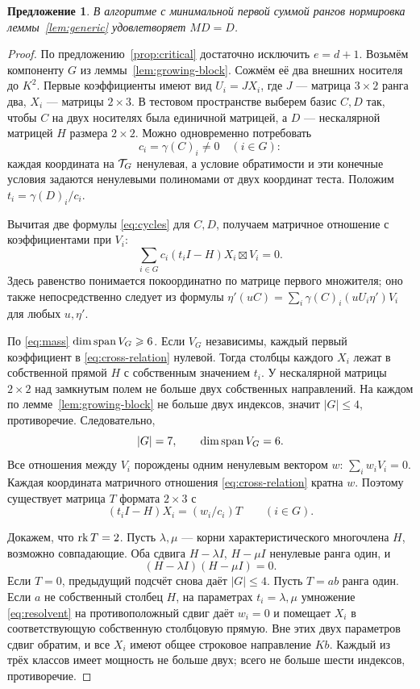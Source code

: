 \documentclass[11pt,a4paper]{article}
\numberwithin{equation}{section}
\theoremstyle{plain}
\newtheorem{prop}[theorem]{Предложение}
\theoremstyle{definition}
\newcommand{\leqs}{\leqslant}\newcommand{\geqs}{\geqslant}
\begin{document}
\begin{prop}\label{prop:no-growth}
В алгоритме с минимальной первой суммой рангов нормировка
леммы~\ref{lem:generic} удовлетворяет $MD=D$.
\end{prop}
\begin{proof}
По предложению~\ref{prop:critical} достаточно исключить $e=d+1$.
Возьмём компоненту $G$ из леммы~\ref{lem:growing-block}.
Сожмём её два внешних носителя до $K^2$. Первые коэффициенты имеют вид
$U_i=JX_i$, где $J$ --- матрица $3\times2$ ранга два,
$X_i$ --- матрицы $2\times3$. В тестовом пространстве выберем базис
$C,D$ так, чтобы $C$ на двух носителях была единичной матрицей,
а $D$ --- нескалярной матрицей $H$ размера $2\times2$.
Можно одновременно потребовать
\[
 c_i=\gamma(C)_i\ne0\quad(i\in G):
\]
каждая координата на $\mathcal T_G$ ненулевая, а условие обратимости
и эти конечные условия задаются ненулевыми полиномами от двух
координат теста. Положим $t_i=\gamma(D)_i/c_i$.

Вычитая две формулы \eqref{eq:cycles} для $C,D$, получаем матричное
отношение с коэффициентами при $V_i$:
\begin{equation}\label{eq:cross-relation}
 \sum_{i\in G} c_i(t_iI-H)X_i\boxtimes V_i=0.
\end{equation}
Здесь равенство понимается покоординатно по матрице первого множителя;
оно также непосредственно следует из формулы
$\eta'(uC)=\sum_i\gamma(C)_i(uU_i\eta')V_i$ для любых $u,\eta'$.

По \eqref{eq:mass} $\dim\Span V_G\geqs6$.
Если $V_G$ независимы, каждый первый коэффициент в
\eqref{eq:cross-relation} нулевой. Тогда столбцы каждого $X_i$ лежат
в собственной прямой $H$ с собственным значением $t_i$.
У нескалярной матрицы $2\times2$ над замкнутым полем не больше двух
собственных направлений. На каждом по лемме~\ref{lem:growing-block}
не больше двух индексов, значит $|G|\leqs4$, противоречие.
Следовательно,
\[
 |G|=7,\qquad \dim\operatorname{span} V_G=6.
\]
Все отношения между $V_i$ порождены одним ненулевым вектором $w$:
$\sum_iw_iV_i=0$. Каждая координата матричного отношения
\eqref{eq:cross-relation} кратна $w$. Поэтому существует матрица
$T$ формата $2\times3$ с
\begin{equation}\label{eq:resolvent}
 (t_iI-H)X_i=(w_i/c_i)T\qquad(i\in G).
\end{equation}

Докажем, что $\operatorname{rk} T=2$. Пусть $\lambda,\mu$ --- корни
характеристического многочлена $H$, возможно совпадающие. Оба сдвига
$H-\lambda I$, $H-\mu I$ ненулевые ранга один, и
\begin{equation}\label{eq:CH}
 (H-\lambda I)(H-\mu I)=0.
\end{equation}
Если $T=0$, предыдущий подсчёт снова даёт $|G|\leqs4$.
Пусть $T=ab$ ранга один. Если $a$ не собственный столбец $H$,
на параметрах $t_i=\lambda,\mu$ умножение \eqref{eq:resolvent} на
противоположный сдвиг даёт $w_i=0$ и помещает $X_i$ в соответствующую
собственную столбцовую прямую. Вне этих двух параметров сдвиг обратим,
и все $X_i$ имеют общее строковое направление $Kb$.
Каждый из трёх классов имеет мощность не больше двух; всего не больше
шести индексов, противоречие.


\end{proof}
\end{document}
